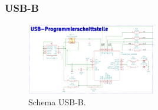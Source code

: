 \clearpage
\subsubsection{USB-B}
\label{subsubsec:USB-B}

\begin{figure}[h!]
	\centering
	\includegraphics[width=0.5\textwidth]{graphics/Schema_USB_B}
	\caption{Schema USB-B.}
	\label{fig:Schema_USB_B}
\end{figure}

